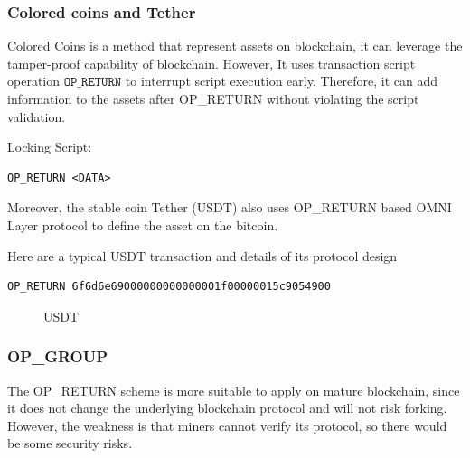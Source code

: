 \documentclass[a4paper,11pt]{article}
\begin{document}
\subsubsection*{Colored coins and Tether}

Colored Coins\cite{ColoredCoins} is a method that represent assets on blockchain, it can leverage the tamper-proof capability of blockchain. However, It uses transaction script operation $\texttt{OP\_RETURN}$ to interrupt script execution early. Therefore, it can add information to the assets after OP\_RETURN without violating the script validation. 

Locking Script:
\begin{lstlisting}
OP_RETURN <DATA>
\end{lstlisting}

Moreover, the stable coin Tether\cite{Tether} (USDT) also uses OP\_RETURN based OMNI Layer protocol to define the asset on the bitcoin.

Here are a typical USDT transaction and details of its protocol design


\lstset{basicstyle=\tiny,style=myListStyle}
\begin{lstlisting}
OP_RETURN 6f6d6e69000000000000001f00000015c9054900
\end{lstlisting}


\begin{figure}[hbt]
	\centerline{%
	}
\caption{USDT}
\end{figure}





\subsubsection*{OP\_GROUP}
The OP\_RETURN  scheme is more suitable to apply on mature blockchain, since it does not change the underlying blockchain protocol and will not risk forking. However, the weakness is that miners cannot verify its protocol, so there would be some security risks.
\end{document}
